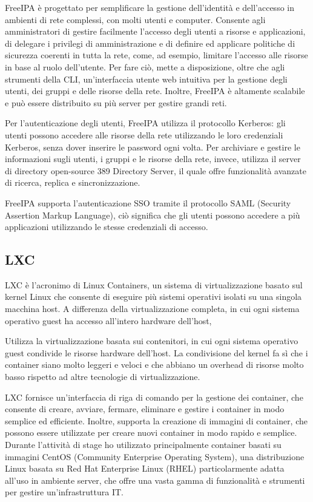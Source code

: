 FreeIPA è progettato per semplificare la gestione dell'identità e dell'accesso in ambienti di rete complessi, con molti utenti e computer. Consente agli amministratori di gestire facilmente l'accesso degli utenti a risorse e applicazioni, di delegare i privilegi di amministrazione e di definire ed applicare politiche di sicurezza coerenti in tutta la rete, come, ad esempio, limitare l'accesso alle risorse in base al ruolo dell'utente. Per fare ciò, mette a disposizione, oltre che agli strumenti della CLI, un'interfaccia utente web intuitiva per la gestione degli utenti, dei gruppi e delle risorse della rete. Inoltre, FreeIPA è altamente scalabile e può essere distribuito su più server per gestire grandi reti.

Per l'autenticazione degli utenti, FreeIPA utilizza il protocollo Kerberos: gli utenti possono accedere alle risorse della rete utilizzando le loro credenziali Kerberos, senza dover inserire le password ogni volta.
Per archiviare e gestire le informazioni sugli utenti, i gruppi e le risorse della rete, invece, utilizza il server di directory open-source 389 Directory Server, il quale offre funzionalità avanzate di ricerca, replica e sincronizzazione.

FreeIPA supporta l'autenticazione SSO tramite il protocollo SAML (Security Assertion Markup Language), ciò significa che gli utenti possono accedere a più applicazioni utilizzando le stesse credenziali di accesso.

\subsection{LXC}
LXC è l'acronimo di Linux Containers, un sistema di virtualizzazione basato sul kernel Linux che consente di eseguire più sistemi operativi isolati su una singola macchina host. A differenza della virtualizzazione completa, in cui ogni sistema operativo guest ha accesso all'intero hardware dell'host, 

Utilizza la virtualizzazione basata sui contenitori, in cui ogni sistema operativo guest condivide le risorse hardware dell'host.
La condivisione del kernel fa sì che i container siano molto leggeri e veloci e che abbiano un overhead di risorse molto basso rispetto ad altre tecnologie di virtualizzazione.

LXC fornisce un'interfaccia di riga di comando per la gestione dei container, che consente di creare, avviare, fermare, eliminare e gestire i container in modo semplice ed efficiente. Inoltre, supporta la creazione di immagini di container, che possono essere utilizzate per creare nuovi container in modo rapido e semplice.
\\
Durante l'attività di stage ho utilizzato principalmente container basati su immagini CentOS (Community Enterprise Operating System), una distribuzione Linux basata su Red Hat Enterprise Linux (RHEL) particolarmente adatta all'uso in ambiente server, che offre una vasta gamma di funzionalità e strumenti per gestire un'infrastruttura IT. 

